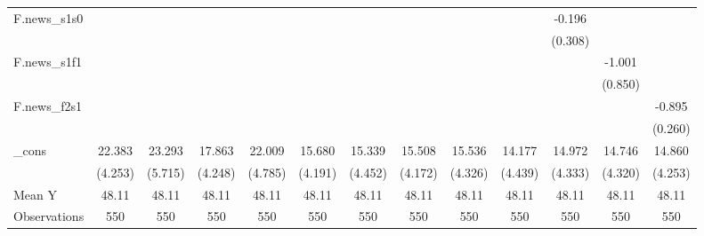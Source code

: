 {\begin{tabular}{l*{12}{c}}
\addlinespace
F.news\_s1s0 &                     &                     &                     &                     &                     &                     &                     &                     &                     &      -0.196         &                     &                     \\
            &                     &                     &                     &                     &                     &                     &                     &                     &                     &     (0.308)         &                     &                     \\
\addlinespace
F.news\_s1f1 &                     &                     &                     &                     &                     &                     &                     &                     &                     &                     &      -1.001         &                     \\
            &                     &                     &                     &                     &                     &                     &                     &                     &                     &                     &     (0.850)         &                     \\
\addlinespace
F.news\_f2s1 &                     &                     &                     &                     &                     &                     &                     &                     &                     &                     &                     &      -0.895\sym{***}\\
            &                     &                     &                     &                     &                     &                     &                     &                     &                     &                     &                     &     (0.260)         \\
\addlinespace
\_cons      &      22.383\sym{***}&      23.293\sym{***}&      17.863\sym{***}&      22.009\sym{***}&      15.680\sym{***}&      15.339\sym{***}&      15.508\sym{***}&      15.536\sym{***}&      14.177\sym{***}&      14.972\sym{***}&      14.746\sym{***}&      14.860\sym{***}\\
            &     (4.253)         &     (5.715)         &     (4.248)         &     (4.785)         &     (4.191)         &     (4.452)         &     (4.172)         &     (4.326)         &     (4.439)         &     (4.333)         &     (4.320)         &     (4.253)         \\
\midrule
Mean Y      &       48.11         &       48.11         &       48.11         &       48.11         &       48.11         &       48.11         &       48.11         &       48.11         &       48.11         &       48.11         &       48.11         &       48.11         \\
Observations&         550         &         550         &         550         &         550         &         550         &         550         &         550         &         550         &         550         &         550         &         550         &         550         \\
\bottomrule
\end{tabular}
}
